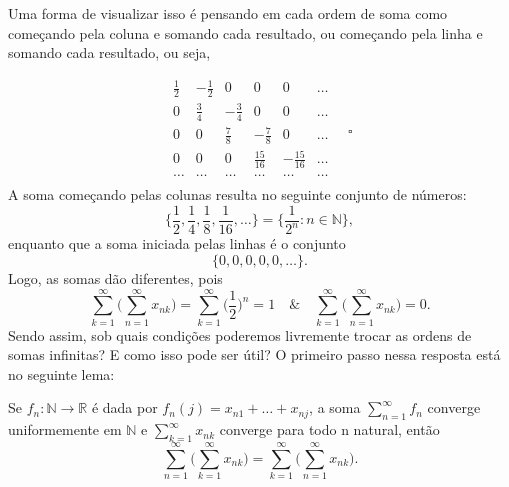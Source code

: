 \documentclass[../analysis_notes.tex]{subfiles}
\begin{document}
Uma forma de visualizar isso é pensando em cada ordem de soma como começando pela coluna e somando cada resultado, ou começando pela linha e somando cada resultado, ou seja,

\[
	\begin{matrix}
		\frac{1}{2} & -\frac{1}{2} & 0            & 0             & 0              & \dotsc \\
		0           & \frac{3}{4}  & -\frac{3}{4} & 0             & 0              & \dotsc \\
		0           & 0            & \frac{7}{8}  & -\frac{7}{8}  & 0              & \dotsc \\
		0           & 0            & 0            & \frac{15}{16} & -\frac{15}{16} & \dotsc \\
		\dotsc      & \dotsc       & \dotsc       & \dotsc        & \dotsc         & \dotsc \\
	\end{matrix}\quad \square
\]
A soma começando pelas colunas resulta no seguinte conjunto de números:
\[
	\biggl\{\frac{1}{2}, \frac{1}{4}, \frac{1}{8}, \frac{1}{16}, \dotsc \biggr\} = \biggl\{\frac{1}{2^{n}}:n\in \mathbb{N}\biggr\} ,
\]
enquanto que a soma iniciada pelas linhas é o conjunto
\[
	\{0, 0, 0, 0, 0, \dotsc \}.
\]
Logo, as somas dão diferentes, pois
\[
	\sum\limits_{k=1}^{\infty}\biggl(\sum\limits_{n=1}^{\infty}x_{nk}\biggr)=\sum\limits_{k=1}^{\infty}\biggl(\frac{1}{2}\biggr)^{n} = 1 \quad\&\quad \sum\limits_{k=1}^{\infty}\biggl(\sum\limits_{n=1}^{\infty}x_{nk}\biggr) = 0.
\]
Sendo assim, sob quais condições poderemos livremente trocar as ordens de somas infinitas? E como isso pode ser útil? O primeiro passo nessa resposta está no seguinte lema:
\begin{lemma*}
	Se \(f_{n}:\mathbb{N}\rightarrow \mathbb{R}\) é dada por \(f_{n}(j)=x_{n1}+\dotsc +x_{nj}\), a soma \(\sum\limits_{n=1}^{\infty}f_{n}\) converge uniformemente em \(\mathbb{N}\) e \(\sum\limits_{k=1}^{\infty}x_{nk}\) converge para todo n natural, então
	\[
		\sum\limits_{n=1}^{\infty}\biggl(\sum\limits_{k=1}^{\infty}x_{nk}\biggr) = \sum\limits_{k=1}^{\infty}\biggl(\sum\limits_{n=1}^{\infty}x_{nk}\biggr).
	\]
\end{lemma*}
\end{document}
